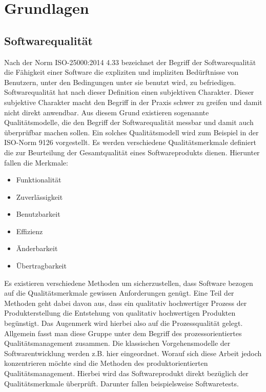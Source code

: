 \chapter{Grundlagen}
\label{sec:grundlagen}


\section{Softwarequalität}
\label{sec:softwarequalität}

Nach der Norm ISO-25000:2014 4.33 bezeichnet der Begriff der Softwarequalität die Fähigkeit einer Software die expliziten und impliziten Bedürftnisse von Benutzern, unter den Bedingungen unter sie benutzt wird, zu befriedigen.  \cite {international_organization_for_standardization_iso_so/iec_2014}
Softwarequalität hat nach dieser Definition einen subjektiven Charakter.
Dieser subjektive Charakter macht den Begriff in der Praxis schwer zu greifen und damit nicht direkt anwendbar. Aus diesem Grund existieren sogenannte Qualitätsmodelle, die den Begriff der Softwarequalität messbar und damit auch überprüfbar machen sollen.
Ein solches Qualitätsmodell wird zum Beispiel in der ISO-Norm 9126 vorgestellt.
Es werden verschiedene Qualitätsmerkmale definiert die zur Beurteilung der Gesamtqualität eines Softwareprodukts dienen.
Hierunter fallen die Merkmale:

\begin{itemize}
	  \itemsep0pt
      \item Funktionalität
      \item Zuverlässigkeit
      \item Benutzbarkeit
      \item Effizienz
      \item Änderbarkeit
      \item Übertragbarkeit          
\end{itemize}

Es existieren verschiedene Methoden um sicherzustellen, dass Software bezogen auf die Qualitätsmerkmale gewissen Anforderungen genügt.
Eine Teil der Methoden geht dabei davon aus, dass ein qualitativ hochwertiger Prozess der Produkterstellung die Entstehung von qualitativ hochwertigen Produkten begünstigt.
Das Augenmerk wird hierbei also auf die Prozessqualität gelegt.
Allgemein fasst man diese Gruppe unter dem Begriff des prozessorientiertes Qualitätsmanagement zusammen. Die klassischen Vorgehensmodelle der Softwarentwicklung werden z.B. hier eingeordnet.
Worauf sich diese Arbeit jedoch konzentrieren möchte sind die Methoden des produktorientierten Qualitätsmanagement.
Hierbei wird das Softwareprodukt direkt bezüglich der Qualitätsmerkmale überprüft.
Darunter fallen beispielsweise Softwaretests.


